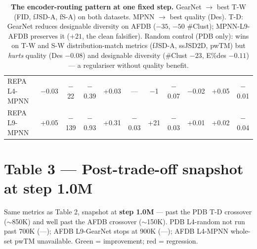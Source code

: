 \documentclass[11pt,a4paper]{article}
\newcommand{\gd}[1]{\cellcolor{green!20}#1}
\newcommand{\rd}[1]{\cellcolor{red!15}#1}
\begin{document}
\begin{table}[H]
{\begin{tabular}{l|cc|ccc|cc|c|cc}
REPA L4-MPNN   & \rd{$-$0.03} & \gd{$-$22} & \gd{$-$0.39} & \gd{+0.03} & ---   & \rd{$-$1}  & \gd{$-$0.07} & \gd{$-$0.02} & \rd{+0.05} & \rd{$-$0.01} \\
REPA L9-MPNN   & \gd{+0.05} & \gd{$-$139} & \gd{$-$0.93} & \gd{+0.31} & \gd{$-$0.03} & \gd{+21} & \gd{$-$0.03} & \rd{+0.01} & \rd{+0.02} & \rd{$-$0.04} \\
\bottomrule
\end{tabular}}
\caption{\textbf{The encoder-routing pattern at one fixed step.} GearNet
$\to$ best T-W (FID, fJSD-A, fS-A) on both datasets. MPNN $\to$ best
quality (Des). T-D: GearNet reduces designable diversity on AFDB
($-35$, $-50$ \#Clust); MPNN-L9-AFDB preserves it ($+21$, the clean
falsifier). Random control (PDB only): wins on T-W and S-W
distribution-match metrics (fJSD-A, ssJSD2D, pwTM) but \emph{hurts}
quality (Des $-0.08$) and designable diversity (\#Clust $-23$,
E\%des $-0.11$) --- a regulariser without quality benefit.}
\end{table}

\section{Table 3 --- Post-trade-off snapshot at step 1.0M}

Same metrics as Table 2, snapshot at \textbf{step 1.0M} --- past the PDB
T-D crossover ($\sim$850K) and well past the AFDB crossover ($\sim$150K).
PDB L4-random not run past 700K (---); AFDB L9-GearNet stops at 900K (---);
AFDB L4-MPNN whole-set pwTM unavailable. \colorbox{green!20}{Green} = improvement; \colorbox{red!15}{red} = regression.
\end{document}
